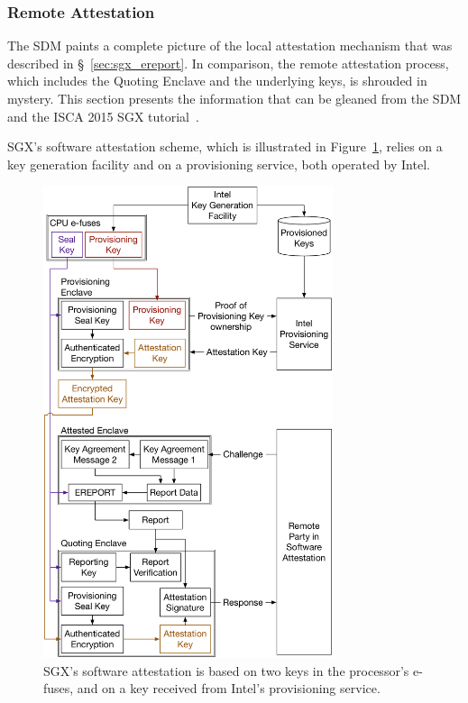 

\subsubsection{Remote Attestation}
\label{sec:sgx_quoting_enclave}

The SDM paints a complete picture of the local attestation mechanism that was
described in \S~\ref{sec:sgx_ereport}. In comparison, the remote attestation
process, which includes the Quoting Enclave and the underlying keys, is
shrouded in mystery. This section presents the information that can be gleaned
from the SDM and the ISCA 2015 SGX tutorial~\cite{intel2015iscasgx}.


SGX's software attestation scheme, which is illustrated in
Figure~\ref{fig:sgx_attestation_keys}, relies on a key generation facility and
on a provisioning service, both operated by Intel.

\begin{figure}[hbt]
  \centering
  \includegraphics[width=85mm]{figures/sgx_attestation_keys.pdf}
  \caption{
    SGX's software attestation is based on two keys in the processor's e-fuses,
    and on a key received from Intel's provisioning service.
  }
  \label{fig:sgx_attestation_keys}
\end{figure}

